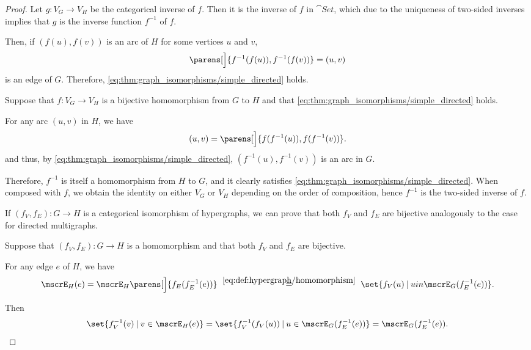 \begin{proof}
  Let \( g: V_G \to V_H \) be the categorical inverse of \( f \). Then it is the inverse of \( f \) in \( \cat{Set} \), which due to the uniqueness of two-sided inverses implies that \( g \) is the inverse function \( f^{-1} \) of \( f \).

  Then, if \( (f(u), f(v)) \) is an arc of \( H \) for some vertices \( u \) and \( v \),
  \begin{equation*}
    \parens[\Big]{ f^{-1}(f(u)), f^{-1}(f(v)) } = (u, v)
  \end{equation*}
  is an edge of \( G \). Therefore, \eqref{eq:thm:graph_isomorphisms/simple_directed} holds.

  \NecessitySubProof* Suppose that \( f: V_G \to V_H \) is a bijective homomorphism from \( G \) to \( H \) and that \eqref{eq:thm:graph_isomorphisms/simple_directed} holds.

  For any arc \( (u, v) \) in \( H \), we have
  \begin{equation*}
    (u, v) = \parens[\Big]{ f(f^{-1}(u)), f(f^{-1}(v)) }.
  \end{equation*}
  and thus, by \eqref{eq:thm:graph_isomorphisms/simple_directed}, \( (f^{-1}(u), f^{-1}(v)) \) is an arc in \( G \).

  Therefore, \( f^{-1} \) is itself a homomorphism from \( H \) to \( G \), and it clearly satisfies \eqref{eq:thm:graph_isomorphisms/simple_directed}. When composed with \( f \), we obtain the identity on either \( V_G \) or \( V_H \) depending on the order of composition, hence \( f^{-1} \) is the two-sided inverse of \( f \).


  \SufficiencySubProof* If \( (f_V, f_E): G \to H \) is a categorical isomorphism of hypergraphs, we can prove that both \( f_V \) and \( f_E \) are bijective analogously to the case for directed multigraphs.

  \NecessitySubProof* Suppose that \( (f_V, f_E): G \to H \) is a homomorphism and that both \( f_V \) and \( f_E \) are bijective.

  For any edge \( e \) of \( H \), we have
  \begin{equation*}
    \mscrE_H(e)
    =
    \mscrE_H\parens[\Big]{ f_E(f_E^{-1}(e)) }
    \reloset {\eqref{eq:def:hypergraph/homomorphism}} =
    \set{ f_V(u) \given u in \mscrE_G(f_E^{-1}(e)) }.
  \end{equation*}

  Then
  \begin{equation*}
    \set{ f_V^{-1}(v) \given v \in \mscrE_H(e) }
    =
    \set{ f_V^{-1}(f_V(u)) \given u \in \mscrE_G(f_E^{-1}(e)) }
    =
    \mscrE_G(f_E^{-1}(e)).
  \end{equation*}


\end{proof}
